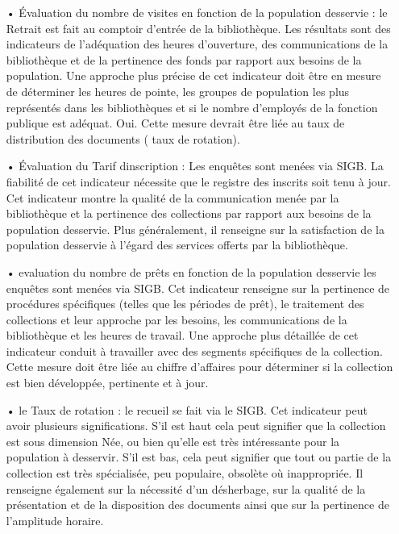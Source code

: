 \documentclass[french,a4paper,12pt]{article}
\begin{document}
 \begin{enumerate}
  \item[•]  Évaluation du  nombre de visites en fonction de la population desservie : le Retrait est fait au comptoir d'entrée de la bibliothèque. Les résultats sont des indicateurs de l'adéquation des heures d'ouverture, des communications de la bibliothèque et de la pertinence des fonds par rapport aux besoins de la population. Une approche plus précise de cet indicateur doit être en mesure de déterminer les heures de pointe, les groupes de population les plus représentés dans les bibliothèques et si le nombre d'employés de la fonction publique est adéquat. Oui. Cette mesure devrait être liée au taux de distribution des documents ( taux de rotation). 
  
 \item[•] Évaluation du Tarif dinscription   : Les enquêtes sont menées via SIGB. La fiabilité de cet indicateur nécessite que le registre des inscrits soit tenu à jour. Cet indicateur montre la qualité de la communication menée par la bibliothèque et la pertinence des collections par rapport aux besoins de la population desservie. Plus généralement, il renseigne sur la satisfaction de la population desservie à l'égard des services offerts par la bibliothèque. 
 
  \item[•]evaluation du  nombre de prêts en fonction de la population desservie les enquêtes sont menées via SIGB. Cet indicateur renseigne sur la pertinence de procédures spécifiques (telles que les périodes de prêt), le traitement des collections et leur approche par les besoins, les communications de la bibliothèque et les heures de travail. Une approche plus détaillée de cet indicateur conduit à travailler avec des segments spécifiques de la collection. Cette mesure doit être liée au chiffre d'affaires pour déterminer si la collection est bien développée, pertinente et à jour. 
  
   \item[•]  le Taux de rotation : le recueil se fait via le SIGB. Cet indicateur peut avoir plusieurs significations. S’il est haut cela peut signifier que la collection est sous dimension 
Née, ou bien qu’elle est très intéressante pour la population à desservir. S’il est bas, cela peut signifier que tout ou partie de la collection est très spécialisée, peu populaire, obsolète où inappropriée. Il renseigne également sur la nécessité d’un désherbage, sur la qualité de la présentation et de la disposition des documents ainsi que sur la pertinence de l’amplitude horaire. 


\end{enumerate}
\end{document}
